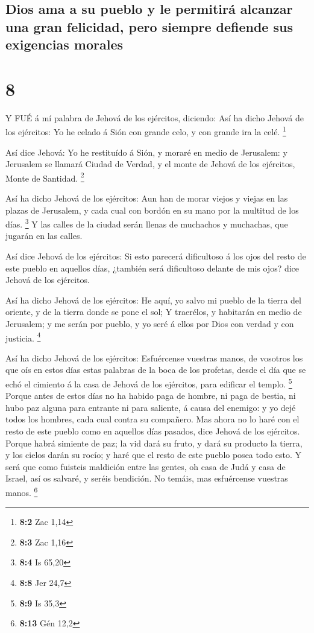 \hypertarget{dios-ama-a-su-pueblo-y-le-permitiruxe1-alcanzar-una-gran-felicidad-pero-siempre-defiende-sus-exigencias-morales}{%
\subsection{Dios ama a su pueblo y le permitirá alcanzar una gran
felicidad, pero siempre defiende sus exigencias
morales}\label{dios-ama-a-su-pueblo-y-le-permitiruxe1-alcanzar-una-gran-felicidad-pero-siempre-defiende-sus-exigencias-morales}}

\hypertarget{section-7}{%
\section{8}\label{section-7}}

 Y FUÉ á mí palabra de Jehová de los ejércitos, diciendo:
 Así ha dicho Jehová de los ejércitos: Yo he celado á Sión
con grande celo, y con grande ira la celé. \footnote{\textbf{8:2} Zac
  1,14}

 Así dice Jehová: Yo he restituído á Sión, y moraré en medio
de Jerusalem: y Jerusalem se llamará Ciudad de Verdad, y el monte de
Jehová de los ejércitos, Monte de Santidad. \footnote{\textbf{8:3} Zac
  1,16}

 Así ha dicho Jehová de los ejércitos: Aun han de morar
viejos y viejas en las plazas de Jerusalem, y cada cual con bordón en su
mano por la multitud de los días. \footnote{\textbf{8:4} Is 65,20}
 Y las calles de la ciudad serán llenas de muchachos y
muchachas, que jugarán en las calles.

 Así dice Jehová de los ejércitos: Si esto parecerá
dificultoso á los ojos del resto de este pueblo en aquellos días,
¿también será dificultoso delante de mis ojos? dice Jehová de los
ejércitos.

 Así ha dicho Jehová de los ejércitos: He aquí, yo salvo mi
pueblo de la tierra del oriente, y de la tierra donde se pone el sol;
 Y traerélos, y habitarán en medio de Jerusalem; y me serán
por pueblo, y yo seré á ellos por Dios con verdad y con justicia.
\footnote{\textbf{8:8} Jer 24,7}

 Así ha dicho Jehová de los ejércitos: Esfuércense vuestras
manos, de vosotros los que oís en estos días estas palabras de la boca
de los profetas, desde el día que se echó el cimiento á la casa de
Jehová de los ejércitos, para edificar el templo. \footnote{\textbf{8:9}
  Is 35,3}  Porque antes de estos días no ha habido paga de
hombre, ni paga de bestia, ni hubo paz alguna para entrante ni para
saliente, á causa del enemigo: y yo dejé todos los hombres, cada cual
contra su compañero.  Mas ahora no lo haré con el resto de
este pueblo como en aquellos días pasados, dice Jehová de los ejércitos.
 Porque habrá simiente de paz; la vid dará su fruto, y dará
su producto la tierra, y los cielos darán su rocío; y haré que el resto
de este pueblo posea todo esto.  Y será que como fuisteis
maldición entre las gentes, oh casa de Judá y casa de Israel, así os
salvaré, y seréis bendición. No temáis, mas esfuércense vuestras manos.
\footnote{\textbf{8:13} Gén 12,2}

